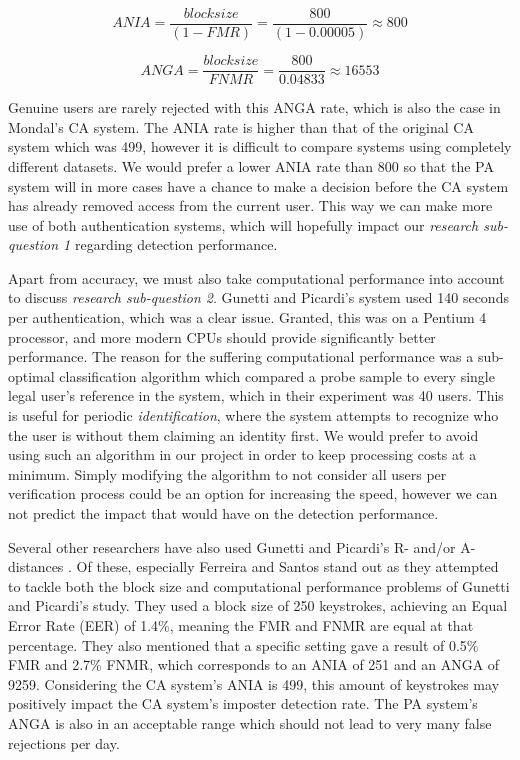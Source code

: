 \begin{equation}
ANIA = \frac{block size}{(1-FMR)} = \frac{800}{(1-0.00005)} \approx 800
\end{equation}

\begin{equation}
ANGA = \frac{block size}{FNMR} = \frac{800}{0.04833} \approx 16553
\end{equation}

Genuine users are rarely rejected with this ANGA rate, which is also the case in Mondal's \cite{mondal} CA system.
The ANIA rate is higher than that of the original CA system which was 499, however it is difficult to compare systems using completely different datasets.
We would prefer a lower ANIA rate than 800 so that the PA system will in more cases have a chance to make a decision before the CA system has already removed access from the current user.
This way we can make more use of both authentication systems, which will hopefully impact our \textit{research sub-question 1} regarding detection performance.

Apart from accuracy, we must also take computational performance into account to discuss \textit{research sub-question 2}.
Gunetti and Picardi's \cite{gnp} system used 140 seconds per authentication, which was a clear issue.
Granted, this was on a Pentium 4 processor, and more modern CPUs should provide significantly better performance.
The reason for the suffering computational performance was a sub-optimal classification algorithm which compared a probe sample to every single legal user's reference in the system, which in their experiment was 40 users.
This is useful for periodic \textit{identification}, where the system attempts to recognize who the user is without them claiming an identity first.
We would prefer to avoid using such an algorithm in our project in order to keep processing costs at a minimum.
Simply modifying the algorithm to not consider all users per verification process could be an option for increasing the speed, however we can not predict the impact that would have on the detection performance.

Several other researchers have also used Gunetti and Picardi's R- and/or A-distances \cite{davoudi2009, davoudi2010, superResults, hu, sliding, Kolakowska2011, Messerman, Pinto2014, meaningless, KANG201572}.
Of these, especially Ferreira and Santos \cite{superResults} stand out as they attempted to tackle both the block size and computational performance problems of Gunetti and Picardi's \cite{gnp} study.
They used a block size of 250 keystrokes, achieving an Equal Error Rate (EER) of 1.4\%, meaning the FMR and FNMR are equal at that percentage.
They also mentioned that a specific setting gave a result of 0.5\% FMR and 2.7\% FNMR, which corresponds to an ANIA of 251 and an ANGA of 9259.
Considering the CA system's ANIA is 499, this amount of keystrokes may positively impact the CA system's imposter detection rate.
The PA system's ANGA is also in an acceptable range which should not lead to very many false rejections per day.


